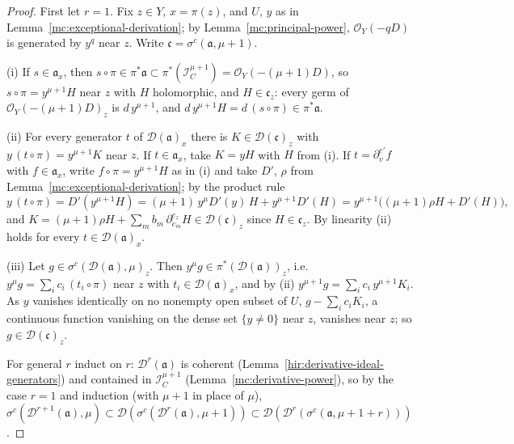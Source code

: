 \begin{proof}
\leanok
First let \(r=1\). Fix \(z\in Y\), \(x=\pi(z)\), and \(U\), \(y\) as in Lemma~\ref{mc:exceptional-derivation}; by Lemma~\ref{mc:principal-power},
\(\mathcal O_Y(-qD)\) is generated by \(y^q\) near \(z\). Write \(\mathfrak c=\sigma^c(\mathfrak a,\mu+1)\).

(i) If \(s\in\mathfrak a_x\), then \(s\circ\pi\in\pi^*\mathfrak a\subset\pi^*(\mathcal I_C^{\mu+1})=\mathcal O_Y(-(\mu+1)D)\), so \(s\circ\pi=y^{\mu+1}H\) near \(z\) with \(H\)
holomorphic, and \(H\in\mathfrak c_z\): every germ of \(\mathcal O_Y(-(\mu+1)D)_z\) is \(d\,y^{\mu+1}\), and \(d\,y^{\mu+1}H=d\,(s\circ\pi)\in\pi^*\mathfrak a\).

(ii) For every generator \(t\) of \(\mathcal D(\mathfrak a)_x\) there is \(K\in\mathcal D(\mathfrak c)_z\) with \(y\,(t\circ\pi)=y^{\mu+1}K\) near \(z\). If
\(t\in\mathfrak a_x\), take \(K=yH\) with \(H\) from (i). If \(t=\partial^{e'}_vf\) with \(f\in\mathfrak a_x\), write \(f\circ\pi=y^{\mu+1}H\) as in (i) and take \(D'\),
\(\rho\) from Lemma~\ref{mc:exceptional-derivation}; by the product rule
\[
 y\,(t\circ\pi)=D'(y^{\mu+1}H)=(\mu+1)\,y^{\mu}D'(y)\,H+y^{\mu+1}D'(H)=y^{\mu+1}\bigl((\mu+1)\rho H+D'(H)\bigr),
\]
and \(K=(\mu+1)\rho H+\sum_mb_m\,\partial^{e_z}_{e_m}H\in\mathcal D(\mathfrak c)_z\) since \(H\in\mathfrak c_z\). By linearity (ii) holds for every
\(t\in\mathcal D(\mathfrak a)_x\).

(iii) Let \(g\in\sigma^c(\mathcal D(\mathfrak a),\mu)_z\). Then \(y^\mu g\in\pi^*(\mathcal D(\mathfrak a))_z\), i.e.\ \(y^\mu g=\sum_ic_i\,(t_i\circ\pi)\) near \(z\) with
\(t_i\in\mathcal D(\mathfrak a)_x\), and by (ii) \(y^{\mu+1}g=\sum_ic_i\,y^{\mu+1}K_i\). As \(y\) vanishes identically on no nonempty open subset of \(U\),
\(g-\sum_ic_iK_i\), a continuous function vanishing on the dense set \(\{y\ne0\}\) near \(z\), vanishes near \(z\); so \(g\in\mathcal D(\mathfrak c)_z\).

For general \(r\) induct on \(r\): \(\mathcal D^r(\mathfrak a)\) is coherent (Lemma~\ref{hir:derivative-ideal-generators}) and contained in
\(\mathcal I_C^{\mu+1}\) (Lemma~\ref{mc:derivative-power}), so by the case \(r=1\) and induction (with \(\mu+1\) in place of \(\mu\)),
\(\sigma^c(\mathcal D^{r+1}(\mathfrak a),\mu)\subset\mathcal D(\sigma^c(\mathcal D^r(\mathfrak a),\mu+1))\subset\mathcal D(\mathcal D^r(\sigma^c(\mathfrak a,\mu+1+r)))\).
\end{proof}


